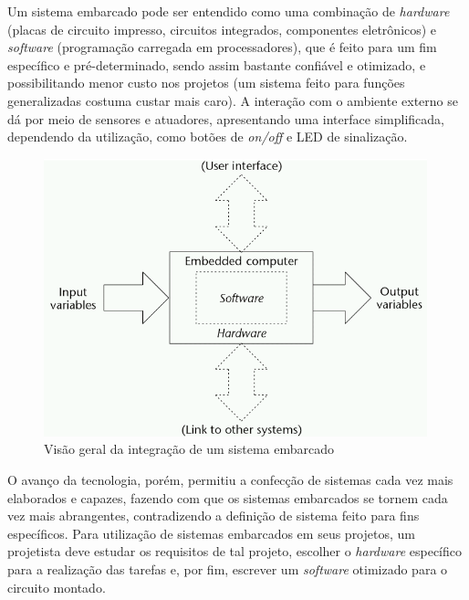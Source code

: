 Um sistema embarcado pode ser entendido como uma combinação de \textit{hardware} (placas de circuito impresso, circuitos integrados, componentes eletrônicos) e \textit{software} (programação carregada em processadores), que é feito para um fim específico e pré-determinado, sendo assim bastante confiável e otimizado, e possibilitando menor custo nos projetos (um sistema feito para funções generalizadas costuma custar mais caro). A interação com o ambiente externo se dá por meio de sensores e atuadores, apresentando uma interface simplificada, dependendo da utilização, como botões de \textit{on/off} e \ac{LED} de sinalização\cite{book4}. 

\begin{figure}[ht]
    \begin{center}
    \includegraphics{figuras/embedded.PNG}
    \end{center}
    \caption[]{Visão geral da integração de um sistema embarcado}
    \label{embarcado}
\end{figure}

O avanço da tecnologia, porém, permitiu a confecção de sistemas cada vez mais elaborados e capazes, fazendo com que os sistemas embarcados se tornem cada vez mais abrangentes, contradizendo a definição de sistema feito para fins específicos. Para utilização de sistemas embarcados em seus projetos, um projetista deve estudar os requisitos de tal projeto, escolher o \textit{hardware} específico para a realização das tarefas e, por fim, escrever um \textit{software} otimizado para o circuito montado\cite{embedded}. %


